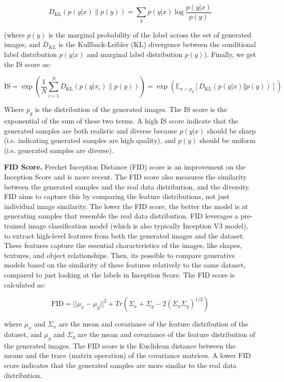 \[
    D_{\text{KL}}(p(y|x) \| p(y)) = \sum_{y} p(y|x) \log \frac{p(y|x)}{p(y)}
\]

(where $p(y)$ is the marginal probability of the label across the set of generated images, and $D_{KL}$ is the Kullback-Leibler (KL) divergence between the conditional label distribution $p(y|x)$ and marginal label distribution $p(y)$). Finally, we get the IS score as:

\[
    \text{IS} = \exp \left( \frac{1}{N} \sum_{i=1}^{N} D_{\text{KL}}(p(y|x_i) \| p(y)) \right) = \exp(\mathbb{E}_{x \sim p_g} \left[ D_{\text{KL}} \left( p(y | x) \Vert p(y) \right) \right])
\]

Where $p_g$ is the distribution of the generated images. The IS score is the exponential of the sum of these two terms. A high IS score indicate that the generated samples are both realistic and diverse because $p(y|x)$ should be sharp (i.e. indicating generated samples are high quality), and $p(y)$ should be uniform (i.e. generated samples are diverse).






\textbf{FID Score.} Frechet Inception Distance (FID) score \cite{fid_score} is an improvement on the Inception Score and is more recent. The FID score also measures the similarity between the generated samples and the real data distribution, and the diversity. FID aims to capture this by comparing the feature distributions, not just individual image similarity. The lower the FID score, the better the model is at generating samples that resemble the real data distribution. FID leverages a pre-trained image classification model (which is also typically Inception V3 model), to extract high-level features from both the generated images and the dataset. These features capture the essential characteristics of the images, like shapes, textures, and object relationships. Then, its possible to compare generative models based on the similarity of these features relatively to the same dataset, compared to just looking at the labels in Inception Score. The FID score is calculated as:

\begin{equation}
    \text{FID} = ||\mu_x - \mu_g||^2 + Tr(\Sigma_x + \Sigma_g - 2(\Sigma_x\Sigma_g)^{1/2})
    \label{eq:fid_score}
\end{equation}

where $\mu_x$ and $\Sigma_x$ are the mean and covariance of the feature distribution of the dataset, and $\mu_g$ and $\Sigma_g$ are the mean and covariance of the feature distribution of the generated images. The FID score is the Euclidean distance between the means and the trace (matrix operation) of the covariance matrices. A lower FID score indicates that the generated samples are more similar to the real data distribution.

